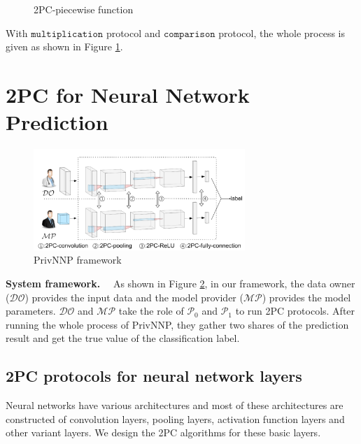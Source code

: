 \documentclass[letterpaper]{article} %
\begin{document}
\begin{figure}[ht]
{\begin{tabular}{lcl}
    \end{tabular}}
    \caption{2PC-piecewise function}
    \label{2PC-piecewise}


    \end{figure}
    With $\mathtt{multiplication}$ protocol and $\mathtt{comparison}$ protocol,
    the whole process is given as shown in Figure \ref{2PC-piecewise}.

    \section{2PC for Neural Network Prediction}


    \begin{figure}[ht]

        \centering
        \includegraphics[width=8cm]{screenshot3.png}
        \caption{PrivNNP framework}
        \label{framework}
    \end{figure}

    \textbf{System framework.}~~
    As shown in Figure \ref{framework}, in our framework,
    the data owner ($\mathcal{DO}$) provides the input data
    and the model provider ($\mathcal{MP}$) provides the model parameters.
    $\mathcal{DO}$ and $\mathcal{MP}$ take the role of
    $\mathcal{P}_{0}$ and $\mathcal{P}_{1}$ to run 2PC protocols.
    After running the whole process of PrivNNP, they gather two shares of the prediction result and
    get the true value of the classification label.

\subsection{2PC protocols for neural network layers}
    Neural networks have various architectures and
    most of these architectures are constructed of convolution layers,
    pooling layers, activation function layers and other variant layers.
    We design the 2PC algorithms for these basic layers.
\end{document}
